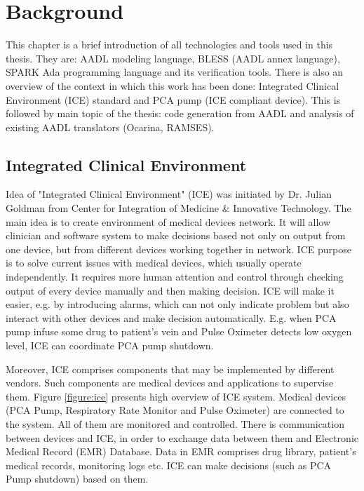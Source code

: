 
\cleardoublepage


\chapter{Background}
\label{background}

This chapter is a brief introduction of all technologies and tools used in this thesis. They are: AADL modeling language, BLESS (AADL annex language), SPARK Ada programming language and its verification tools. There is also an overview of the context in which this work has been done: Integrated Clinical Environment (ICE) standard and PCA pump (ICE compliant device). This is followed by main topic of the thesis: code generation from AADL and analysis of existing AADL translators (Ocarina, RAMSES).



\section{Integrated Clinical Environment}
\label{background:ice}

Idea of "Integrated Clinical Environment" (ICE) was initiated by Dr. Julian Goldman from Center for Integration of Medicine \& Innovative Technology. The main idea is to create environment of medical devices network. It will allow clinician and software system to make decisions based not only on output from one device, but from different devices working together in network. ICE purpose is to solve current issues with medical devices, which usually operate independently. It requires more human attention and control through checking output of every device manually and then making decision. ICE will make it easier, e.g. by introducing alarms, which can not only indicate problem but also interact with other devices and make decision automatically. E.g. when PCA pump infuse some drug to patient's vein and Pulse Oximeter detects low oxygen level, ICE can coordinate PCA pump shutdown.

Moreover, ICE comprises components that may be implemented by different vendors. Such components are medical devices and applications to supervise them. Figure \ref{figure:ice} presents high overview of ICE system. Medical devices (PCA Pump, Respiratory Rate Monitor and Pulse Oximeter) are connected to the system. All of them are monitored and controlled. There is communication between devices and ICE, in order to exchange data between them and Electronic Medical Record (EMR) Database. Data in EMR comprises drug library, patient's medical records, monitoring logs etc. ICE can make decisions (such as PCA Pump shutdown) based on them.

